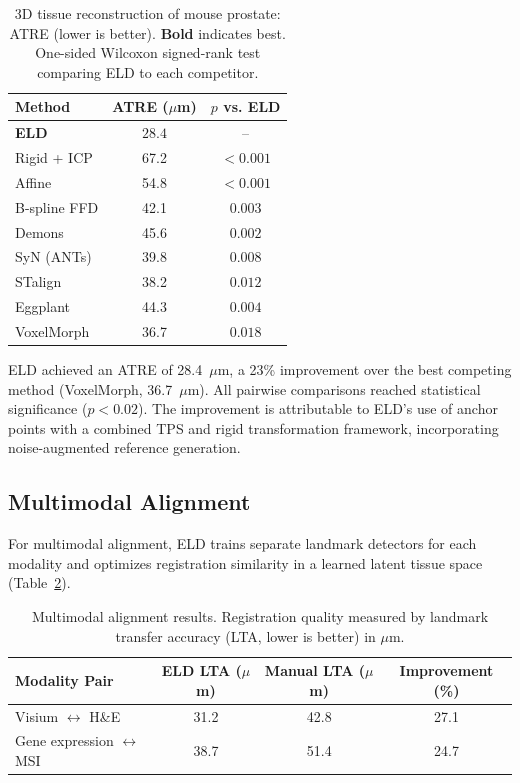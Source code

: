 \documentclass[11pt]{article}
\begin{document}
\begin{table}[H]
\centering
\caption{3D tissue reconstruction of mouse prostate: ATRE (lower is better). \textbf{Bold} indicates best. One-sided Wilcoxon signed-rank test comparing ELD to each competitor.}
\label{tab:3d}
\begin{tabular}{lcc}
\toprule
Method & ATRE ($\mu$m) & $p$ vs. ELD \\
\midrule
\textbf{ELD} & $\mathbf{28.4}$ & -- \\
Rigid + ICP & 67.2 & $< 0.001$ \\
Affine & 54.8 & $< 0.001$ \\
B-spline FFD & 42.1 & $0.003$ \\
Demons & 45.6 & $0.002$ \\
SyN (ANTs) & 39.8 & $0.008$ \\
STalign & 38.2 & $0.012$ \\
Eggplant & 44.3 & $0.004$ \\
VoxelMorph & 36.7 & $0.018$ \\
\bottomrule
\end{tabular}
\end{table}

ELD achieved an ATRE of 28.4~$\mu$m, a 23\% improvement over the best competing method (VoxelMorph, 36.7~$\mu$m). All pairwise comparisons reached statistical significance ($p < 0.02$). The improvement is attributable to ELD's use of anchor points with a combined TPS and rigid transformation framework, incorporating noise-augmented reference generation.

\subsection{Multimodal Alignment}

For multimodal alignment, ELD trains separate landmark detectors for each modality and optimizes registration similarity in a learned latent tissue space (Table~\ref{tab:multimodal}).

\begin{table}[H]
\centering
\caption{Multimodal alignment results. Registration quality measured by landmark transfer accuracy (LTA, lower is better) in $\mu$m.}
\label{tab:multimodal}
\begin{tabular}{lccc}
\toprule
Modality Pair & ELD LTA ($\mu$m) & Manual LTA ($\mu$m) & Improvement (\%) \\
\midrule
Visium $\leftrightarrow$ H\&E & 31.2 & 42.8 & 27.1 \\
Gene expression $\leftrightarrow$ MSI & 38.7 & 51.4 & 24.7 \\
\bottomrule
\end{tabular}
\end{table}
\end{document}
